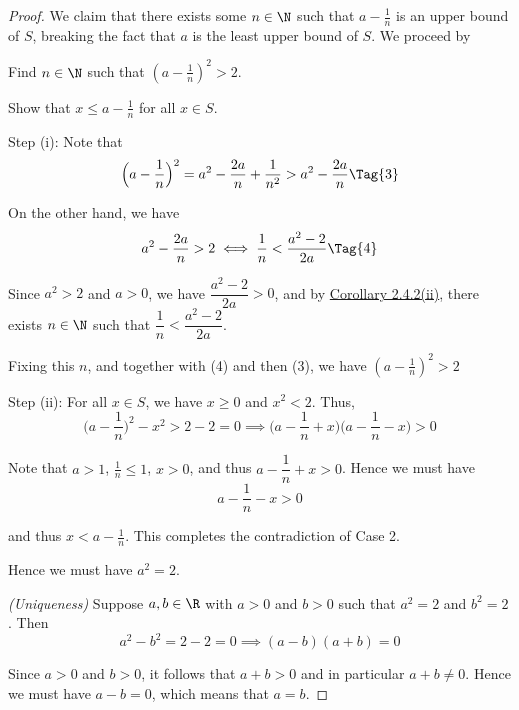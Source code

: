 \begin{proof}
  We claim that there exists some $n\in\N$ such that $a-\frac1n$ is an upper
  bound of $S$, breaking the fact that $a$ is the least upper bound of $S$. We
  proceed by
  \begin{enumerati}
    \item Find $n\in\N$ such that $(a-\frac1n)^2>2$.
    \item Show that $x\leq a-\frac1n$ for all $x\in S$.
  \end{enumerati}

  Step (i): Note that
  \begin{equation*}
    \Big(a-\frac1n\Big)^2=a^2-\frac{2a}n+\frac1{n^2}>a^2-\frac{2a}n\Tag{3}
  \end{equation*}

  On the other hand, we have
  \begin{equation*}
    a^2-\frac{2a}n>2\iff\frac1n<\frac{a^2-2}{2a}\Tag{4}
  \end{equation*}

  Since $a^2>2$ and $a>0$, we have $\dfrac{a^2-2}{2a}>0$, and by
  \href{d845856}{Corollary 2.4.2(ii)}, there exists $n\in\N$ such that
  $\dfrac1n<\dfrac{a^2-2}{2a}$.

  Fixing this $n$, and together with (4) and then (3), we have $(a-\frac1n)^2>2$

  Step (ii): For all $x\in S$, we have $x\geq0$ and $x^2<2$. Thus,
  \begin{equation*}
    \Big(a-\frac1n\Big)^2-x^2>2-2=0\implies\Big(a-\frac1n+x\Big)\Big(a-\frac1n-x\Big)>0
  \end{equation*}

  Note that $a>1$, $\frac1n\leq 1$, $x>0$, and thus $a-\dfrac1n+x>0$. Hence we
  must have
  $$
    a-\frac1n-x>0
  $$

  and thus $x<a-\frac1n$. This completes the contradiction of Case 2.

  Hence we must have $a^2=2$.

  \textit{(Uniqueness)} Suppose $a,b\in\R$ with $a>0$ and $b>0$ such that
  $a^2=2$ and $b^2=2$. Then
  \begin{equation*}
    a^2-b^2=2-2=0\implies(a-b)(a+b)=0
  \end{equation*}

  Since $a>0$ and $b>0$, it follows that $a+b>0$ and in particular $a+b\neq0$.
  Hence we must have $a-b=0$, which means that $a=b$.
\end{proof}
